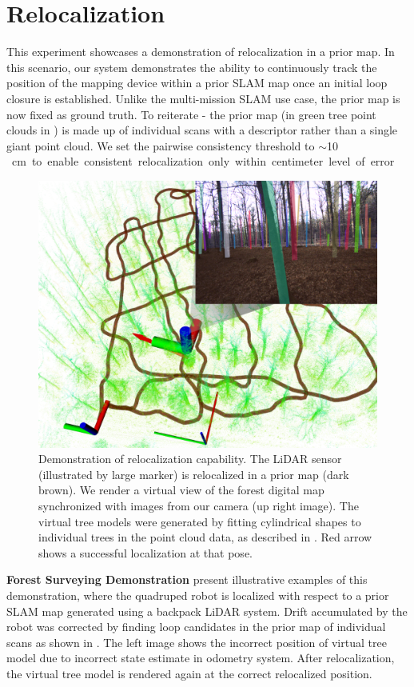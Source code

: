 \section{Relocalization} 
\label{sec:exp_relocalization}
This experiment showcases a demonstration of relocalization in a prior map. In this scenario, our system demonstrates the ability to continuously track the position of the mapping device within a prior SLAM map once an initial loop closure is established. Unlike the multi-mission SLAM use case, the prior map is now fixed as ground truth. To reiterate - the prior map (in green tree point clouds in ) is made up of individual scans with a descriptor rather than a single giant point cloud. We set the pairwise consistency threshold to $\sim$\SI{10}\,cm to enable consistent relocalization only within centimeter level of error. \vspace{5pt}
\begin{figure}[htbp]
  \centering
  \includegraphics[width=0.65\linewidth]{pics/exp_4_relocalization_demo.png}
  \caption{Demonstration of relocalization capability. The LiDAR sensor (illustrated by large marker) is relocalized in a prior map (dark brown). We render a virtual view of the forest digital map synchronized with images from our camera (up right image). The virtual tree models were generated by fitting cylindrical shapes to individual trees in the point cloud data, as described in \cite{freißmuth2024arxiv}. Red arrow shows a successful localization at that pose.}
  \label{fig:relocalization_demo}
\end{figure}

\noindent\textbf{Forest Surveying Demonstration}\hspace{0.5em}
 present illustrative examples of this demonstration, where the quadruped robot is localized with respect to a prior SLAM map generated using a backpack LiDAR system. Drift accumulated by the robot was corrected by finding loop candidates in the prior map of individual scans as shown in . The left image shows the incorrect position of virtual tree model due to incorrect state estimate in odometry system. After relocalization, the virtual tree model is rendered again at the correct relocalized position. 

